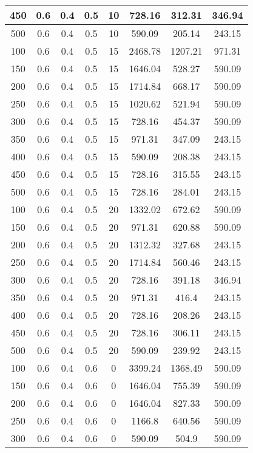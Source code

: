 \documentclass[a4paper, 12pt]{extreport}
\begin{document}
\begin{itemize}
\begin{longtable}{|c|c|c|c|c|c|c|c|}
			450 & 0.6 & 0.4 & 0.5 & 10 & 728.16 & 312.31 & 346.94 \\\hline
			500 & 0.6 & 0.4 & 0.5 & 10 & 590.09 & 205.14 & 243.15 \\\hline
			100 & 0.6 & 0.4 & 0.5 & 15 & 2468.78 & 1207.21 & 971.31 \\\hline
			150 & 0.6 & 0.4 & 0.5 & 15 & 1646.04 & 528.27 & 590.09 \\\hline
			200 & 0.6 & 0.4 & 0.5 & 15 & 1714.84 & 668.17 & 590.09 \\\hline
			250 & 0.6 & 0.4 & 0.5 & 15 & 1020.62 & 521.94 & 590.09 \\\hline
			300 & 0.6 & 0.4 & 0.5 & 15 & 728.16 & 454.37 & 590.09 \\\hline
			350 & 0.6 & 0.4 & 0.5 & 15 & 971.31 & 347.09 & 243.15 \\\hline
			400 & 0.6 & 0.4 & 0.5 & 15 & 590.09 & 208.38 & 243.15 \\\hline
			450 & 0.6 & 0.4 & 0.5 & 15 & 728.16 & 315.55 & 243.15 \\\hline
			500 & 0.6 & 0.4 & 0.5 & 15 & 728.16 & 284.01 & 243.15 \\\hline
			100 & 0.6 & 0.4 & 0.5 & 20 & 1332.02 & 672.62 & 590.09 \\\hline
			150 & 0.6 & 0.4 & 0.5 & 20 & 971.31 & 620.88 & 590.09 \\\hline
			200 & 0.6 & 0.4 & 0.5 & 20 & 1312.32 & 327.68 & 243.15 \\\hline
			250 & 0.6 & 0.4 & 0.5 & 20 & 1714.84 & 560.46 & 243.15 \\\hline
			300 & 0.6 & 0.4 & 0.5 & 20 & 728.16 & 391.18 & 346.94 \\\hline
			350 & 0.6 & 0.4 & 0.5 & 20 & 971.31 & 416.4 & 243.15 \\\hline
			400 & 0.6 & 0.4 & 0.5 & 20 & 728.16 & 208.26 & 243.15 \\\hline
			450 & 0.6 & 0.4 & 0.5 & 20 & 728.16 & 306.11 & 243.15 \\\hline
			500 & 0.6 & 0.4 & 0.5 & 20 & 590.09 & 239.92 & 243.15 \\\hline
			100 & 0.6 & 0.4 & 0.6 & 0 & 3399.24 & 1368.49 & 590.09 \\\hline
			150 & 0.6 & 0.4 & 0.6 & 0 & 1646.04 & 755.39 & 590.09 \\\hline
			200 & 0.6 & 0.4 & 0.6 & 0 & 1646.04 & 827.33 & 590.09 \\\hline
			250 & 0.6 & 0.4 & 0.6 & 0 & 1166.8 & 640.56 & 590.09 \\\hline
			300 & 0.6 & 0.4 & 0.6 & 0 & 590.09 & 504.9 & 590.09 \\\hline

\end{longtable}
\end{itemize}
\end{document}
